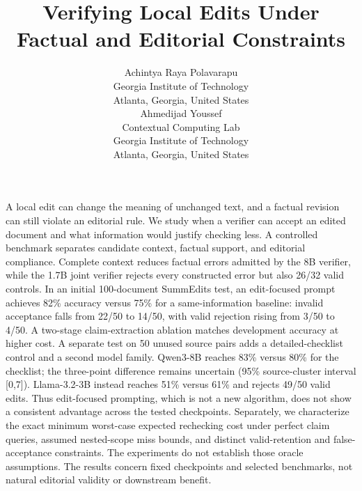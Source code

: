 \documentclass[10pt,letterpaper,twocolumn]{article}
\title{Verifying Local Edits Under\\Factual and Editorial Constraints}
\author{%
\begin{minipage}[t]{.46\textwidth}\centering
Achintya Raya Polavarapu\\[3pt]
{\fontsize{10}{12}\selectfont Georgia Institute of Technology}\\
{\fontsize{10}{12}\selectfont Atlanta, Georgia, United States}
\end{minipage}\hfill
\begin{minipage}[t]{.46\textwidth}\centering
Ahmedijad Youssef\\[3pt]
{\fontsize{10}{12}\selectfont Contextual Computing Lab}\\
{\fontsize{10}{12}\selectfont Georgia Institute of Technology}\\
{\fontsize{10}{12}\selectfont Atlanta, Georgia, United States}
\end{minipage}}
\date{}
\makeatletter
\renewenvironment{abstract}
 {\par\noindent{\fontsize{11}{13}\selectfont\bfseries ABSTRACT}\par
  \vspace{3pt}\fontsize{9.2}{11}\selectfont\noindent\ignorespaces}
 {\par\vspace{5pt}}
\renewcommand{\maketitle}{\twocolumn[{
 \centering
 {\sffamily\fontsize{17.2}{20.2}\selectfont\bfseries\@title\par}
 \vspace{12pt}
 {\rmfamily\fontsize{12}{14}\selectfont\mdseries\@author\par}
 \vspace{12pt}
 }]\thispagestyle{plain}}
\makeatother
\begin{document}
\maketitle
\begin{abstract}
A local edit can change the meaning of unchanged text, and a factual revision can still violate an editorial rule. We study when a verifier can accept an edited document and what information would justify checking less. A controlled benchmark separates candidate context, factual support, and editorial compliance. Complete context reduces factual errors admitted by the 8B verifier, while the 1.7B joint verifier rejects every constructed error but also 26/32 valid controls. In an initial 100-document SummEdits test, an edit-focused prompt achieves 82\% accuracy versus 75\% for a same-information baseline: invalid acceptance falls from 22/50 to 14/50, with valid rejection rising from 3/50 to 4/50. A two-stage claim-extraction ablation matches development accuracy at higher cost. A separate test on 50 unused source pairs adds a detailed-checklist control and a second model family. Qwen3-8B reaches 83\% versus 80\% for the checklist; the three-point difference remains uncertain (95\% source-cluster interval [0,7]). Llama-3.2-3B instead reaches 51\% versus 61\% and rejects 49/50 valid edits. Thus edit-focused prompting, which is not a new algorithm, does not show a consistent advantage across the tested checkpoints. Separately, we characterize the exact minimum worst-case expected rechecking cost under perfect claim queries, assumed nested-scope miss bounds, and distinct valid-retention and false-acceptance constraints. The experiments do not establish those oracle assumptions. The results concern fixed checkpoints and selected benchmarks, not natural editorial validity or downstream benefit.
\end{abstract}
\end{document}
